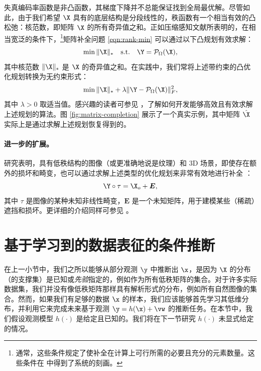 \documentclass[../../book-main_zh.tex]{subfiles}
\begin{document}
失真编码率函数是非凸函数，其梯度下降并不总能保证找到全局最优解。尽管如此，由于我们希望 $\X$ 具有的底层结构是分段线性的，秩函数有一个相当有效的凸松弛：核范数，即矩阵 $\X$ 的所有奇异值之和。正如压缩感知文献所表明的，在相当宽泛的条件下，\footnote{通常，这些条件规定了使补全在计算上可行所需的必要且充分的元素数量。这些条件在 \cite{Wright-Ma-2022} 中得到了系统的刻画。}矩阵补全问题 \eqref{eqn:rank-min} 可以通过以下凸规划有效求解：
\begin{equation}
    \min \|\X\|_* \quad \text{s.t.}
    \quad
    \Y = \mathcal{P}_{\Omega}(\X),
    \label{eqn:nuclear-min}
\end{equation}
其中核范数 $\|\X\|_*$ 是 $\X$ 的奇异值之和。在实践中，我们常将上述带约束的凸优化规划转换为无约束形式：
\begin{equation}
    \min \|\X\|_*  + \lambda \|
    \Y - \mathcal{P}_{\Omega}(\X)\|_F^2,
    \label{eqn:nuclear-min-lagrangian}
\end{equation}
其中 $\lambda > 0$ 取适当值。感兴趣的读者可参见 \cite{Wright-Ma-2022}，了解如何开发能够高效且有效求解上述规划的算法。图 \ref{fig:matrix-completion} 展示了一个真实示例，其中矩阵 $\hat \X$ 实际上是通过求解上述规划恢复得到的。

\paragraph{进一步的扩展。}
研究表明，具有低秩结构的图像（或更准确地说是纹理）和 3D 场景，即使存在额外的损坏和畸变，也可以通过求解上述类型的优化规划来非常有效地进行补全 \cite{Zhang2010TILTTI,Liang-ECCV2012,Yi_2023_ICCV}：
\begin{equation}
    \Y \circ \tau = \X_o + \boldsymbol{E},
\end{equation}
其中 $\tau$ 是图像的某种未知非线性畸变，$\boldsymbol{E}$ 是一个未知矩阵，用于建模某些（稀疏）遮挡和损坏。更详细的介绍同样可参见 \cite{Wright-Ma-2022}。

\section{基于学习到的数据表征的条件推断}
在上一小节中，我们之所以能够从部分观测 $\y$ 中推断出 $\x$，是因为 $\X$ 的分布（的支撑集）是已知或{\em 先验}指定的，例如作为所有低秩矩阵的集合。对于许多实际数据集，我们并没有像低秩矩阵那样具有解析形式的分布，例如所有自然图像的集合。然而，如果我们有足够的数据 $\x$ 的样本，我们应该能够首先学习其低维分布，并利用它来完成未来基于观测 $\y = h(\x) + \vw$ 的推断任务。在本节中，我们假设观测模型 $h(\cdot)$ 是给定且已知的。我们将在下一节研究 $h(\cdot)$ 未显式给定的情况。
\end{document}
